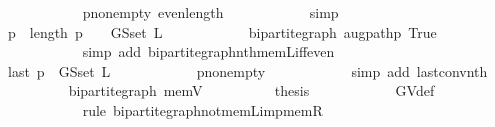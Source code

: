 \begin{isabellebody}
\ \ \ \ \ \ \ \ \ \ \isamarkupfalse%
\ p{\isacharunderscore}{\kern0pt}non{\isacharunderscore}{\kern0pt}empty\ even{\isacharunderscore}{\kern0pt}length\isanewline
\ \ \ \ \ \ \ \ \ \ \isamarkupfalse%
\ simp\isanewline
\ \ \ \ \ \ \ \ \isamarkupfalse%
\ \isamarkupfalse%
\ {\isachardoublequoteopen}p\ {\isacharbang}{\kern0pt}\ {\isacharparenleft}{\kern0pt}length\ p\ {\isacharminus}{\kern0pt}\ {}{\isacharparenright}{\kern0pt}\ {\isasymnotin}\ G{\isachardot}{\kern0pt}S{\isachardot}{\kern0pt}set\ L{\isachardoublequoteclose}\isanewline
\ \ \ \ \ \ \ \ \ \ \isamarkupfalse%
\ bipartite{\isacharunderscore}{\kern0pt}graph\ augpath{\isacharunderscore}{\kern0pt}p\ True\isanewline
\ \ \ \ \ \ \ \ \ \ \isamarkupfalse%
\ {\isacharparenleft}{\kern0pt}simp\ add{\isacharcolon}{\kern0pt}\ bipartite{\isacharunderscore}{\kern0pt}graph{\isachardot}{\kern0pt}nth{\isacharunderscore}{\kern0pt}mem{\isacharunderscore}{\kern0pt}L{\isacharunderscore}{\kern0pt}iff{\isacharunderscore}{\kern0pt}even{\isacharparenright}{\kern0pt}\isanewline
\ \ \ \ \ \ \ \ \isamarkupfalse%
\ {\isachardoublequoteopen}last\ p\ {\isasymnotin}\ G{\isachardot}{\kern0pt}S{\isachardot}{\kern0pt}set\ L{\isachardoublequoteclose}\isanewline
\ \ \ \ \ \ \ \ \ \ \isamarkupfalse%
\ p{\isacharunderscore}{\kern0pt}non{\isacharunderscore}{\kern0pt}empty\isanewline
\ \ \ \ \ \ \ \ \ \ \isamarkupfalse%
\ {\isacharparenleft}{\kern0pt}simp\ add{\isacharcolon}{\kern0pt}\ last{\isacharunderscore}{\kern0pt}conv{\isacharunderscore}{\kern0pt}nth{\isacharparenright}{\kern0pt}\isanewline
\ \ \ \ \ \ \ \ \isamarkupfalse%
\ bipartite{\isacharunderscore}{\kern0pt}graph\ mem{\isacharunderscore}{\kern0pt}V{\isacharparenleft}{\kern0pt}{}{\isacharparenright}{\kern0pt}\isanewline
\ \ \ \ \ \ \ \ \isamarkupfalse%
\ {\isacharquery}{\kern0pt}thesis\isanewline
\ \ \ \ \ \ \ \ \ \ \isamarkupfalse%
\ G{\isachardot}{\kern0pt}V{\isacharunderscore}{\kern0pt}def\isanewline
\ \ \ \ \ \ \ \ \ \ \isamarkupfalse%
\ {\isacharparenleft}{\kern0pt}rule\ bipartite{\isacharunderscore}{\kern0pt}graph{\isachardot}{\kern0pt}not{\isacharunderscore}{\kern0pt}mem{\isacharunderscore}{\kern0pt}L{\isacharunderscore}{\kern0pt}imp{\isacharunderscore}{\kern0pt}mem{\isacharunderscore}{\kern0pt}R{\isacharparenright}{\kern0pt}\isanewline
\ \ \ \ \ \ \isamarkupfalse%
\isanewline
\ \ \ \ \ \ \isamarkupfalse%

\end{isabellebody}

